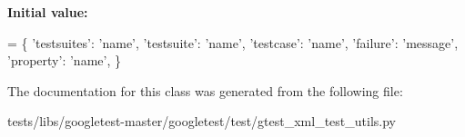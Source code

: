 {\bfseries Initial value\+:}
\begin{DoxyCode}
=  \{
      \textcolor{stringliteral}{'testsuites'}: \textcolor{stringliteral}{'name'},
      \textcolor{stringliteral}{'testsuite'}: \textcolor{stringliteral}{'name'},
      \textcolor{stringliteral}{'testcase'}: \textcolor{stringliteral}{'name'},
      \textcolor{stringliteral}{'failure'}: \textcolor{stringliteral}{'message'},
      \textcolor{stringliteral}{'property'}: \textcolor{stringliteral}{'name'},
  \}
\end{DoxyCode}


The documentation for this class was generated from the following file\+:\begin{DoxyCompactItemize}
\item 
tests/libs/googletest-\/master/googletest/test/gtest\+\_\+xml\+\_\+test\+\_\+utils.\+py\end{DoxyCompactItemize}

